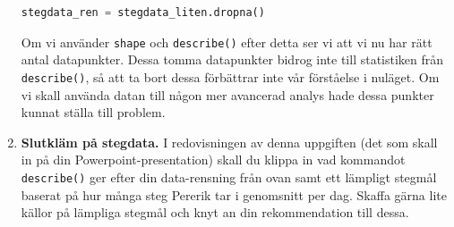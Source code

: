 \documentclass{article}
\begin{document}
\begin{enumerate}
\begin{lstlisting}[language=Python]
stegdata_ren = stegdata_liten.dropna()
\end{lstlisting}
Om vi använder \verb+shape+ och \verb+describe()+ efter detta ser vi att vi nu har rätt antal datapunkter. Dessa tomma datapunkter bidrog inte till statistiken från \verb+describe()+, så att ta bort dessa förbättrar inte vår förståelse i nuläget. Om vi skall använda datan till någon mer avancerad analys hade dessa punkter kunnat ställa till problem.
\item \textbf{Slutkläm på stegdata.} I redovisningen av denna uppgiften (det som skall in på din Powerpoint-presentation) skall du klippa in vad kommandot \verb+describe()+ ger efter din data-rensning från ovan samt ett lämpligt stegmål baserat på hur många steg Pererik tar i genomsnitt per dag. Skaffa gärna lite källor på lämpliga stegmål och knyt an din rekommendation till dessa.
\end{enumerate}
\end{document}
